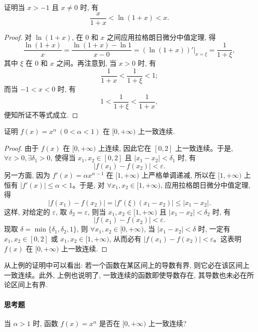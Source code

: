 \begin{example}\label{example:ma-5-1-4}
证明当 $x>-1$ 且 $x\ne0$ 时, 有
\[
  \frac{x}{1+x}<\ln(1+x)<x.
\]
\end{example}


\begin{proof}
对 $\ln(1+x)$, 在 $0$ 和 $x$ 之间应用拉格朗日微分中值定理, 得
\[
  \frac{\ln(1+x)}{x}
  =
  \frac{\ln(1+x)-\ln1}{x-0}
  =
  \left.(\ln(1+x))'\right|_{x=\xi}
  =
  \frac1{1+\xi},
\]
其中 $\xi$ 在 $0$ 和 $x$ 之间。再注意到, 当 $x>0$ 时, 有
\[
  \frac1{1+x}<\frac1{1+\xi}<1;
\]
而当 $-1<x<0$ 时, 有
\[
  1<\frac1{1+\xi}<\frac1{1+x},
\]
便知所证不等式成立.
\end{proof}


\begin{example}\label{example:ma-5-1-5}
证明 $f(x)=x^\alpha\ (0<\alpha<1)$ 在 $[0,+\infty)$ 上一致连续.
\end{example}


\begin{proof}
由于 $f(x)$ 在 $[0,+\infty)$ 上连续, 因此它在 $[0,2]$ 上一致连续。于是, $\forall\varepsilon>0,\exists\delta_1>0$, 使得当 $x_1,x_2\in[0,2]$ 且 $|x_1-x_2|<\delta_1$ 时, 有
\[
  |f(x_1)-f(x_2)|<\varepsilon.
\]
另一方面, 因为 $f'(x)=\alpha x^{\alpha-1}$ 在 $[1,+\infty)$ 上严格单调递减, 所以在 $[1,+\infty)$ 上恒有 $|f'(x)|\leqslant\alpha<1$。于是, 对 $\forall x_1,x_2\in[1,+\infty)$, 应用拉格朗日微分中值定理, 得
\[
  |f(x_1)-f(x_2)|=|f'(\xi)(x_1-x_2)|\leqslant |x_1-x_2|.
\]
这样, 对给定的 $\varepsilon$, 取 $\delta_2=\varepsilon$, 则当 $x_1,x_2\in[1,+\infty)$ 且 $|x_1-x_2|<\delta_2$ 时, 有
\[
  |f(x_1)-f(x_2)|<\varepsilon.
\]
现取 $\delta=\min\{\delta_1,\delta_2,1\}$, 则 $\forall x_1,x_2\in[0,+\infty)$, 当 $|x_1-x_2|<\delta$ 时, 一定有 $x_1,x_2\in[0,2]$ 或 $x_1,x_2\in[1,+\infty)$, 从而必有 $|f(x_1)-f(x_2)|<\varepsilon$。这表明 $f(x)$ 在 $[0,+\infty)$ 上一致连续.
\end{proof}


\begin{remark}\label{remark:ma-5-source-24}
从上例的证明中可以看出: 若一个函数在某区间上的导数有界, 则它必在该区间上一致连续。此外, 上例也说明了, 一致连续的函数即使导数存在, 其导数也未必在所论区间上有界.
\end{remark}


\paragraph*{思考题}
当 $\alpha>1$ 时, 函数 $f(x)=x^\alpha$ 是否在 $[0,+\infty)$ 上一致连续?

